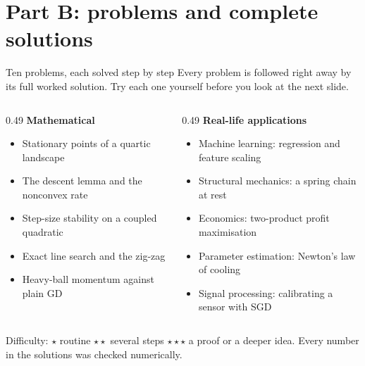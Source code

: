 \section{Part B: problems and complete solutions}

\begin{frame}{Ten problems, each solved step by step}
  \small
  Every problem is followed \alert{right away} by its full worked solution. Try each one yourself before
  you look at the next slide.

  \vspace{4pt}
  \begin{columns}[T]
    \begin{column}{0.49\textwidth}
      \textbf{Mathematical}
      \begin{itemize}\footnotesize
        \item[M1] Stationary points of a quartic landscape
        \item[M2] The descent lemma and the nonconvex rate
        \item[M3] Step-size stability on a coupled quadratic
        \item[M4] Exact line search and the zig-zag
        \item[M5] Heavy-ball momentum against plain GD
      \end{itemize}
    \end{column}
    \begin{column}{0.49\textwidth}
      \textbf{Real-life applications}
      \begin{itemize}\footnotesize
        \item[A1] Machine learning: regression and feature scaling
        \item[A2] Structural mechanics: a spring chain at rest
        \item[A3] Economics: two-product profit maximisation
        \item[A4] Parameter estimation: Newton's law of cooling
        \item[A5] Signal processing: calibrating a sensor with SGD
      \end{itemize}
    \end{column}
  \end{columns}

  \vspace{4pt}
  \footnotesize\textcolor{mGrey}{Difficulty: $\star$ routine \quad $\star\star$ several steps \quad $\star\star\star$ a proof or a deeper idea.
  Every number in the solutions was checked numerically.}
\end{frame}
